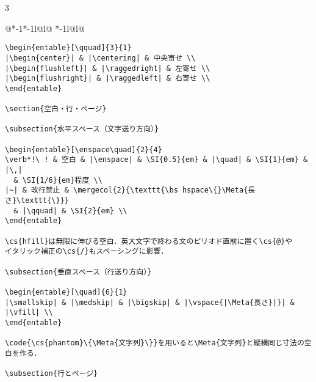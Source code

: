 \documentclass[10pt,a4paper,landscape,dvipdfmx,nomag]{jsarticle}
\makeatletter
\def\set@etsep#1#2{\def\etcolsep{#1}\def\etitemsep{#2}}
\newenvironment{entable}[3][\quad\qquad]{%
  \set@etsep#1\relax\relax
  \begin{tabular}{%
    @{}*{\the\numexpr#3-1}{*{\the\numexpr#2-1}{l@{\etcolsep}}l@{\etitemsep}}%
    *{\the\numexpr#2-1}{l@{\etcolsep}}l@{}}}{%
  \end{tabular}}
\newcommand{\mergecol}[2]{\multicolumn{#1}{@{}l@{}}{#2}}
\newcommand*\eghostguarded{%
  \ifmmode \expandafter\@firstofone
  \else \expandafter\pxqgg@eghostguarded@a
  \fi}
\def\pxqgg@eghostguarded@a#1{%
  {\pxqgg@TI\pxqgg@cwm}%
  #1%
  {\pxqgg@TI\pxqgg@cwm}}
\newcommand{\codefont}{\ttfamily\gtfamily}
\newcommand{\cs}[1]{\eghostguarded{{\codefont \bs #1}}}
\newcommand{\code}[1]{\eghostguarded{{\codefont #1}}}
\newcommand{\Meta}[1]{$\langle$\mbox{}\emph{#1}\mbox{}$\rangle$}
\makeatother
\begin{document}
\begin{multicols}{3}
\begin{entable}[\enspace]{2}{1}
\begin{verbatim}
\begin{entable}[\qquad]{3}{1}
|\begin{center}| & |\centering| & 中央寄せ \\
|\begin{flushleft}| & |\raggedright| & 左寄せ \\
|\begin{flushright}| & |\raggedleft| & 右寄せ \\
\end{entable}

\section{空白・行・ページ}

\subsection{水平スペース（文字送り方向）}

\begin{entable}[\enspace\quad]{2}{4}
\verb*!\ ! & 空白 & |\enspace| & \SI{0.5}{em} & |\quad| & \SI{1}{em} & |\,|
  & \SI{1/6}{em}程度 \\
|~| & 改行禁止 & \mergecol{2}{\texttt{\bs hspace\{}\Meta{長さ}\texttt{\}}}
  & |\qquad| & \SI{2}{em} \\
\end{entable}

\cs{hfill}は無限に伸びる空白．英大文字で終わる文のピリオド直前に置く\cs{@}や
イタリック補正の\cs{/}もスペーシングに影響．

\subsection{垂直スペース（行送り方向）}

\begin{entable}[\quad]{6}{1}
|\smallskip| & |\medskip| & |\bigskip| & |\vspace{|\Meta{長さ}|}| & |\vfill| \\
\end{entable}

\code{\cs{phantom}\{\Meta{文字列}\}}を用いると\Meta{文字列}と縦横同じ寸法の空白を作る．

\subsection{行とページ}


\end{verbatim}
\end{entable}
\end{multicols}
\end{document}
